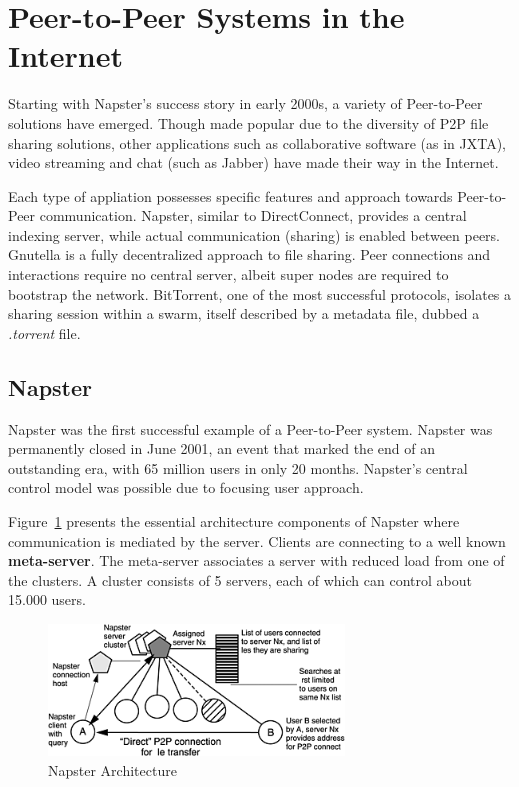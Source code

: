 \section{Peer-to-Peer Systems in the Internet}
\label{sec:p2p-systems:p2p-internet}

Starting with Napster's success story in early 2000s, a variety of
Peer-to-Peer solutions have emerged. Though made popular due to the diversity
of P2P file sharing solutions, other applications such as collaborative
software (as in JXTA), video streaming and chat (such as Jabber) have made
their way in the Internet.

Each type of appliation possesses specific features and approach towards
Peer-to-Peer communication. Napster, similar to DirectConnect, provides a
central indexing server, while actual communication (sharing) is enabled
between peers. Gnutella is a fully decentralized approach to file sharing.
Peer connections and interactions require no central server, albeit super
nodes are required to bootstrap the network. BitTorrent, one of the most
successful protocols, isolates a sharing session within a swarm, itself
described by a metadata file, dubbed a \textit{.torrent} file.

\subsection{Napster}

Napster was the first successful example of a Peer-to-Peer system. Napster was
permanently closed in June 2001, an event that marked the end of an
outstanding era, with 65 million users in only 20 months. Napster's central
control model was possible due to focusing user approach.

Figure~\ref{fig:p2p-systems:napster} presents the essential architecture
components of Napster where communication is mediated by the server. Clients
are connecting to a well known \textbf{meta-server}. The meta-server
associates a server with reduced load from one of the clusters. A cluster
consists of 5 servers, each of which can control about 15.000 users.

\begin{figure}
  \centering
  \includegraphics[width=0.7\textwidth]{src/img/p2p-systems/napster}
  \caption{Napster Architecture}
  \label{fig:p2p-systems:napster}
\end{figure}

